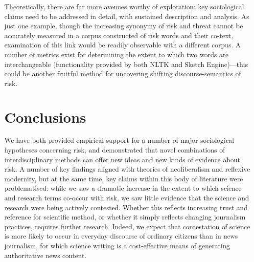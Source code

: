 
Theoretically, there are far more avenues worthy of exploration: key sociological claims need to be addressed in detail, with sustained description and analysis. As just one example, though the increasing synonymy of risk and threat cannot be accurately measured in a corpus constructed of risk words and their co-text, examination of this link would be readily observable with a different corpus. A number of metrics exist for determining the extent to which two words are interchangeable (functionality provided by both NLTK and Sketch Engine)---this could be another fruitful method for uncovering shifting discourse-semantics of risk.

\section{Conclusions}

We have both provided empirical support for a number of major sociological hypotheses concerning risk, and demonstrated that novel combinations of interdisciplinary methods can offer new ideas and new kinds of evidence about risk. A number of key findings aligned with theories of neoliberalism and reflexive modernity, but at the same time, key claims within this body of literature were problematised: while we saw a dramatic increase in the extent to which science and research terms co-occur with risk, we saw little evidence that the science and research were being actively contested. Whether this reflects increasing trust and reference for scientific method, or whether it simply reflects changing journalism practices, requires further research. Indeed, we expect that contestation of science is more likely to occur in everyday discourse of ordinary citizens than in news journalism, for which science writing is a cost-effective means of generating authoritative news content.

